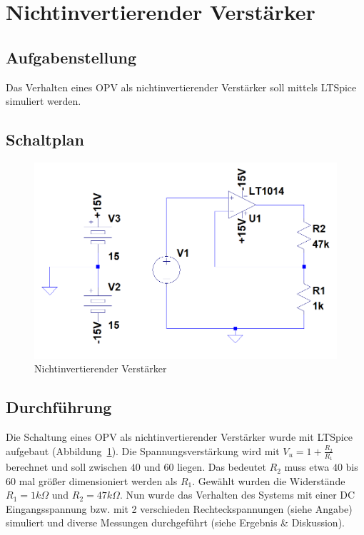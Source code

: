 \documentclass[12pt,a4paper,titlepage]{article}
\begin{document}
\setcounter{page}{2}

\newpage
\setcounter{tocdepth}{1}
\tableofcontents

\newpage



\section{Nichtinvertierender Verst\"arker}

\subsection{Aufgabenstellung}
Das Verhalten eines OPV als nichtinvertierender Verst\"arker soll mittels LTSpice simuliert werden.

\subsection{Schaltplan}
\begin{figure}[H]
  \centering
  \includegraphics{nichtinvertierend_schaltung}
  \caption{Nichtinvertierender Verst\"arker}
  \label{figure01}
\end{figure}

\subsection{Durchf\"uhrung}
\noindent Die Schaltung eines OPV als nichtinvertierender Verst\"arker wurde mit LTSpice aufgebaut (Abbildung~\ref{figure01}). Die Spannungsverst\"arkung wird mit $V_u = 1 + \frac{R_2}{R_1}$ berechnet und soll zwischen $40$ und $60$ liegen. Das bedeutet $R_2$ muss etwa $40$ bis $60$ mal gr\"o\ss er dimensioniert werden als $R_1$. Gew\"ahlt wurden die Widerst\"ande $R_1 = 1k\Omega$ und $R_2 = 47k\Omega$. Nun wurde das Verhalten des Systems mit einer DC Eingangsspannung bzw. mit 2 verschieden Rechteckspannungen (siehe Angabe) simuliert und diverse Messungen durchgef\"uhrt (siehe Ergebnis \& Diskussion).
\end{document}
